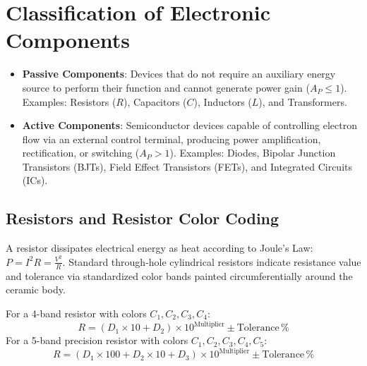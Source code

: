 \section{Classification of Electronic Components}
\begin{definition}
\begin{itemize}
    \item \textbf{Passive Components}: Devices that do not require an auxiliary energy source to perform their function and cannot generate power gain ($A_P \le 1$). Examples: Resistors ($R$), Capacitors ($C$), Inductors ($L$), and Transformers.
    \item \textbf{Active Components}: Semiconductor devices capable of controlling electron flow via an external control terminal, producing power amplification, rectification, or switching ($A_P > 1$). Examples: Diodes, Bipolar Junction Transistors (BJTs), Field Effect Transistors (FETs), and Integrated Circuits (ICs).
\end{itemize}
\end{definition}

\subsection{Resistors and Resistor Color Coding}
A resistor dissipates electrical energy as heat according to Joule's Law: $P = I^2 R = \frac{V^2}{R}$.
Standard through-hole cylindrical resistors indicate resistance value and tolerance via standardized color bands painted circumferentially around the ceramic body.

\begin{keyequation}
For a 4-band resistor with colors $C_1, C_2, C_3, C_4$:
\[ R = (D_1 \times 10 + D_2) \times 10^{\text{Multiplier}} \pm \text{Tolerance}\,\% \]
For a 5-band precision resistor with colors $C_1, C_2, C_3, C_4, C_5$:
\[ R = (D_1 \times 100 + D_2 \times 10 + D_3) \times 10^{\text{Multiplier}} \pm \text{Tolerance}\,\% \]
\end{keyequation}

